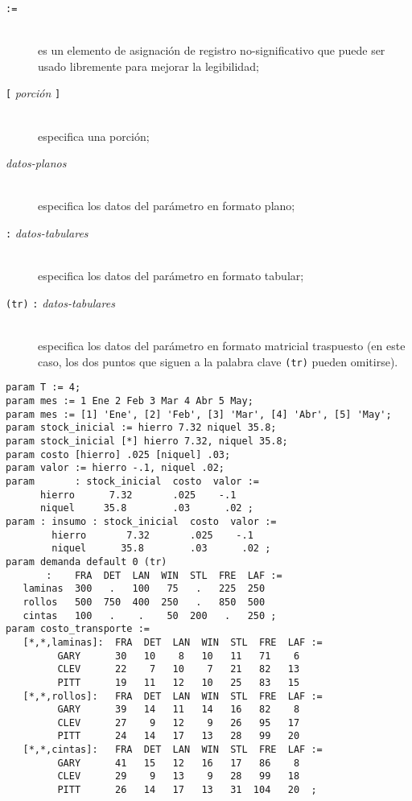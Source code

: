 \documentclass[11pt,spanish]{report}
\def\para#1{\noindent{\bf#1}}
\begin{document}
\begin{description}
\item[{\tt :=}]\hspace*{0pt}\\
es un elemento de asignación de registro no-significativo que puede ser usado libremente para mejorar la legibilidad;
\item[{\tt[} {\it porción} {\tt]}]\hspace*{0pt}\\
especifica una porción;
\item[{\it datos-planos}]\hspace*{0pt}\\
especifica los datos del parámetro en formato plano;
\item[{\tt:} {\it datos-tabulares}]\hspace*{0pt}\\
especifica los datos del parámetro en formato tabular;
\item[{\tt(tr)} {\tt:} {\it datos-tabulares}]\hspace*{0pt}\\
especifica los datos del parámetro en formato matricial traspuesto (en este caso, los dos puntos que siguen a la palabra clave {\tt(tr)} pueden omitirse).
\end{description}

\vspace*{-8pt}

\para{Ejemplos}

\begin{verbatim}
param T := 4;
param mes := 1 Ene 2 Feb 3 Mar 4 Abr 5 May;
param mes := [1] 'Ene', [2] 'Feb', [3] 'Mar', [4] 'Abr', [5] 'May';
param stock_inicial := hierro 7.32 niquel 35.8;
param stock_inicial [*] hierro 7.32, niquel 35.8;
param costo [hierro] .025 [niquel] .03;
param valor := hierro -.1, niquel .02;
param       : stock_inicial  costo  valor :=
      hierro      7.32       .025    -.1
      niquel     35.8        .03      .02 ;
param : insumo : stock_inicial  costo  valor :=
        hierro       7.32       .025    -.1
        niquel      35.8        .03      .02 ;
param demanda default 0 (tr)
       :    FRA  DET  LAN  WIN  STL  FRE  LAF :=
   laminas  300   .   100   75   .   225  250
   rollos   500  750  400  250   .   850  500
   cintas   100   .    .    50  200   .   250 ;
param costo_transporte :=
   [*,*,laminas]:  FRA  DET  LAN  WIN  STL  FRE  LAF :=
         GARY      30   10    8   10   11   71    6
         CLEV      22    7   10    7   21   82   13
         PITT      19   11   12   10   25   83   15
   [*,*,rollos]:   FRA  DET  LAN  WIN  STL  FRE  LAF :=
         GARY      39   14   11   14   16   82    8
         CLEV      27    9   12    9   26   95   17
         PITT      24   14   17   13   28   99   20
   [*,*,cintas]:   FRA  DET  LAN  WIN  STL  FRE  LAF :=
         GARY      41   15   12   16   17   86    8
         CLEV      29    9   13    9   28   99   18
         PITT      26   14   17   13   31  104   20  ;
\end{verbatim}
\end{document}
